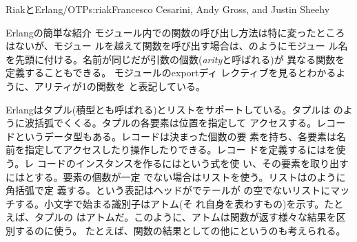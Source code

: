 \begin{aosachapter}{RiakとErlang/OTP}{s:riak}{Francesco Cesarini, Andy Gross, and Justin Sheehy}
\begin{aosasect1}{Erlangの簡単な紹介}
モジュール内での関数の呼び出し方法は特に変ったところはないが、モジュー
ルを越えて関数を呼び出す場合は、のようにモジュー
ル名を先頭に付ける。名前が同じだが引数の個数(\emph{arity}と呼ばれる)が
異なる関数を定義することもできる。 モジュールのexportディ
レクティブを見るとわかるように、アリティが1の関数を
と表記している。


Erlangはタプル(積型とも呼ばれる)とリストをサポートしている。タプルは
のように波括弧でくくる。タプルの各要素は位置を指定して
アクセスする。レコードというデータ型もある。レコードは決まった個数の要
素を持ち、各要素は名前を指定してアクセスしたり操作したりできる。レコー
ドを定義するにはを使う。レ
コードのインスタンスを作るにはという式を使
い、その要素を取り出すにはとする。要素の個数が一定
でない場合はリストを使う。リストは\code{{[}23,34{]}}のように角括弧で定
義する。\code{{[}X|Xs{]}}という表記はヘッドがでテールが
の空でないリストにマッチする。小文字で始まる識別子はアトム(そ
れ自身を表わすもの)を示す。たとえば、タプルの
はアトムだ。このように、アトムは関数が返す様々な結果を区別するのに使う。
たとえば、関数の結果としての他にというのも考えられる。



\end{aosasect1}
\end{aosachapter}
